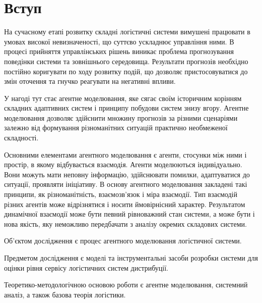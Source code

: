 


\Ukrainian

\begin{titlepage}

\end{titlepage}

\addtocounter{page}{1}



\section*{Вступ}
На сучасному етапі розвитку складні логістичні системи вимушені працювати в умовах високої невизначеності, що суттєво ускладнює управління ними. 
В процесі прийняття управлінських рішень виникає проблема прогнозування поведінки системи та зовнішнього середовища. 
Результати прогнозів необхідно постійно коригувати по ходу розвитку подій, що дозволяє пристосовуватися до змін оточення та гнучко реагувати на негативні впливи. 

У нагоді тут стає агентне моделювання, яке сягає своїм історичним корінням складних адаптивних систем і принципу побудови систем знизу вгору.
Агентне моделювання дозволяє здійснити множину прогнозів за різними сценаріями залежно від формування різноманітних ситуацій практично необмеженої складності. 

Основними елементами агентного моделювання є агенти, стосунки між ними і простір, в якому відбувається взаємодія. 
Агенти моделюються індивідуально. 
Вони можуть мати неповну інформацію, здійснювати помилки, адаптуватися до ситуації, проявляти ініціативу. 
В основу агентного моделювання закладені такі принципи, як різноманітність, взаємозв’язок і міра взаємодії. 
Тип взаємодій різних агентів може відрізнятися і носити ймовірнісний характер. 
Результатом динамічної взаємодії може бути певний рівноважний стан системи, а може бути і нова якість, яку неможливо передбачати з аналізу окремих складових системи.

Об'єктом дослідження є процес агентного моделювання логістичної системи. 

Предметом дослідження є моделі та інструментальні засоби розробки системи для оцінки рівня сервісу логістичних систем дистрибуції.

Теоретико-методологічною основою роботи є агентне моделювання, системний аналіз, а також базова теорія логістики.

